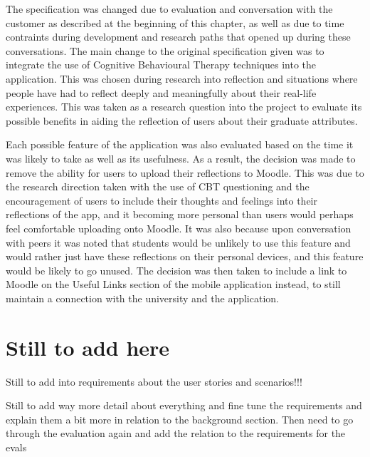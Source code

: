 \documentclass{l4proj}
\begin{document}
The specification was changed due to evaluation and conversation with the customer as described at the beginning of this chapter, as well
as due to time contraints during development and research paths that opened up during these conversations. The main change to the 
original specification given was to integrate the use of Cognitive Behavioural Therapy techniques into the application.
This was chosen during research into reflection and situations where people have had to reflect deeply and meaningfully about
their real-life experiences. This was taken as a research question into the project to evaluate its possible benefits in aiding the 
reflection of users about their graduate attributes. 
\par 
Each possible feature of the application was also evaluated based on the time it
was likely to take as well as its usefulness. As a result, the decision was made to remove the ability for users to upload their 
reflections to Moodle. This was due to the research direction taken with the use of CBT questioning and the encouragement of users
to include their thoughts and feelings into their reflections of the app, and it becoming more personal than users would perhaps feel 
comfortable uploading onto Moodle. It was also because upon conversation with peers it was noted that students would be unlikely to use
this feature and would rather just have these reflections on their personal devices, and this feature would be likely to go unused.
The decision was then taken to include a link to Moodle on the Useful Links section of the mobile application instead, to still maintain 
a connection with the university and the application. 

\section{Still to add here}
Still to add into requirements about the user stories and scenarios!!!
\par 
Still to add way more detail about everything and fine tune the requirements and explain them a bit more in relation to the background
section. Then need to go through the evaluation again and add the relation to the requirements for the evals
\end{document}
